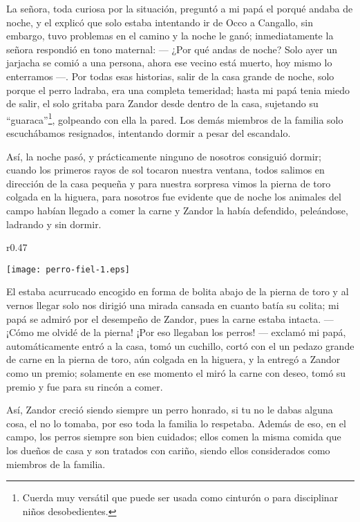 La señora, toda curiosa por la situación, preguntó a mi papá el porqué andaba de noche, y el explicó que solo estaba intentando ir de Occo a Cangallo, sin embargo, tuvo problemas en el camino y la noche le ganó; inmediatamente la señora respondió en tono maternal: 
--- ¿Por qué andas de noche? Solo ayer un jarjacha se comió a una persona, ahora ese vecino está muerto, hoy mismo lo enterramos ---.
Por todas esas historias, salir de la casa grande de noche, solo porque el perro ladraba, era una completa temeridad; hasta mi papá tenia miedo de salir, el solo gritaba para Zandor desde dentro de la casa, sujetando su ``guaraca''\footnote{Cuerda muy versátil que puede ser usada como cinturón o para disciplinar niños desobedientes.}, golpeando con ella la pared.
Los demás miembros de la familia solo escuchábamos resignados, intentando dormir a pesar del escandalo.

Así, la noche pasó, y prácticamente ninguno de nosotros consiguió dormir; cuando los primeros rayos de sol tocaron nuestra ventana, todos salimos en dirección de la casa pequeña y para nuestra sorpresa vimos la pierna de toro colgada en la higuera, para nosotros fue evidente que de noche los animales del campo habían llegado a comer la carne y Zandor la había defendido, peleándose, ladrando y sin dormir. 
\ifdefined\EnableIncludeImages
\begin{wrapfigure}{r}{0.47\textwidth}
  \begin{center}
  \vspace{-0.5cm}
    \texttt{[image: perro-fiel-1.eps]}
  \end{center}
  \vspace{-0.5cm}
\end{wrapfigure}
\fi
El estaba acurrucado encogido en forma de bolita abajo de la pierna de toro y al vernos llegar solo nos dirigió una mirada cansada en cuanto batía su colita; mi papá se admiró por el desempeño de Zandor, pues la carne estaba intacta. 
--- ¡Cómo me olvidé de la pierna! ¡Por eso llegaban los perros! --- exclamó mi papá, 
automáticamente entró a la casa, tomó un cuchillo, cortó con el un pedazo grande de carne en la pierna de toro, aún colgada en la higuera, y la entregó a Zandor como un premio; solamente en ese momento el miró la carne con deseo, tomó su premio y fue para su rincón a comer.

Así, Zandor creció siendo siempre un perro honrado, si tu no le dabas alguna cosa, el no lo tomaba, por eso toda la familia lo respetaba. Además de eso, en el campo, los perros siempre son bien cuidados; ellos comen la misma comida que los dueños de casa y son tratados con cariño, siendo ellos considerados como miembros de la familia.


